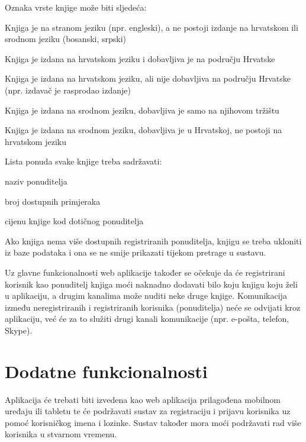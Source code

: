 	\pagebreak
		
	Oznaka vrste knjige može biti sljedeća:
	
	\begin{packed_item}
		\item Knjiga je na stranom jeziku (npr. engleski), a ne postoji izdanje na hrvatskom ili srodnom jeziku (bosanski, srpski)
		\item Knjiga je izdana na hrvatskom jeziku i dobavljiva je na području Hrvatske
		\item Knjiga je izdana na hrvatskom jeziku, ali nije dobavljiva na području Hrvatske (npr. izdavač je rasprodao izdanje)
		\item Knjiga je izdana na srodnom jeziku, dobavljiva je samo na njihovom tržištu
		\item Knjiga je izdana na srodnom jeziku, dobavljiva je u Hrvatskoj, ne postoji na hrvatskom jeziku
	\end{packed_item}
	
	Lista ponuda svake knjige treba sadržavati:
	
	\begin{packed_item}
		\item naziv ponuditelja
		\item broj dostupnih primjeraka
		\item cijenu knjige kod dotičnog ponuditelja
	\end{packed_item}
	
	Ako knjiga nema više dostupnih registriranih ponuditelja, knjigu se treba ukloniti iz baze podataka i ona se ne smije prikazati tijekom pretrage u sustavu.
	
	Uz glavne funkcionalnosti web aplikacije također se očekuje da će registrirani korisnik kao ponuditelj knjiga moći naknadno dodavati bilo koju knjigu koju želi u aplikaciju, a drugim kanalima može nuditi neke druge knjige. Komunikacija između neregistriranih i registriranih korisnika (ponuditelja) neće se odvijati kroz aplikaciju, već će za to služiti drugi kanali komunikacije (npr. e-pošta, telefon, Skype).
	
	\section{Dodatne funkcionalnosti}
	
	Aplikacija će trebati biti izvedena kao web aplikacija prilagođena mobilnom uređaju ili tabletu te će podržavati sustav za registraciju i prijavu korisnika uz pomoć korisničkog imena i lozinke. Sustav također mora moći podržavati rad više korisnika u stvarnom vremenu.
				
